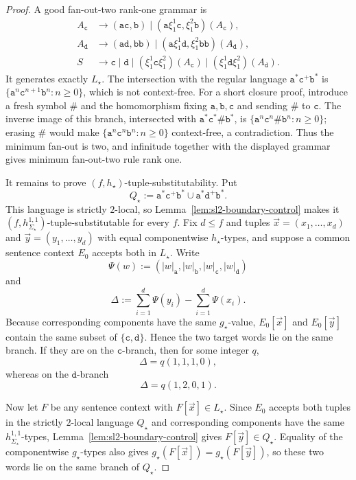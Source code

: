 \documentclass[11pt]{article}
\numberwithin{equation}{section}
\theoremstyle{plain}
\theoremstyle{definition}
\theoremstyle{remark}
\newcommand{\tuple}[1]{\vec{#1}}
\begin{document}
\begin{proof}
A good fan-out-two rank-one grammar is
\[
\begin{aligned}
 A_{\mathtt c}
   &\to(\mathtt a\mathtt c,\mathtt b)
     \mid(\mathtt a\xi_1^1\mathtt c,\xi_1^2\mathtt b)(A_{\mathtt c}),\\
 A_{\mathtt d}
   &\to(\mathtt a\mathtt d,\mathtt b\mathtt b)
     \mid(\mathtt a\xi_1^1\mathtt d,\xi_1^2\mathtt b\mathtt b)(A_{\mathtt d}),\\
 S&\to\mathtt c\mid\mathtt d
   \mid(\xi_1^1\mathtt c\xi_1^2)(A_{\mathtt c})
   \mid(\xi_1^1\mathtt d\xi_1^2)(A_{\mathtt d}).
\end{aligned}
\]
It generates exactly $L_\star$.  The intersection with the regular language
$\mathtt a^*\mathtt c^+\mathtt b^*$ is
$\{\mathtt a^n\mathtt c^{n+1}\mathtt b^n:n\ge0\}$, which is not
context-free.  For a short closure proof, introduce a fresh symbol
$\mathtt\#$ and the homomorphism fixing $\mathtt a,\mathtt b,\mathtt c$ and
sending $\mathtt\#$ to $\mathtt c$.  The inverse image of this branch,
intersected with
$\mathtt a^*\mathtt c^*\mathtt\#\mathtt b^*$, is
$\{\mathtt a^n\mathtt c^n\mathtt\#\mathtt b^n:n\ge0\}$; erasing
$\mathtt\#$ would make $\{\mathtt a^n\mathtt c^n\mathtt b^n:n\ge0\}$
context-free, a contradiction.  Thus the minimum fan-out is two, and
infinitude together with the displayed grammar gives minimum fan-out-two rule
rank one.

It remains to prove $(f,h_\star)$-tuple-substitutability.  Put
\[
 Q_\star
 :=\mathtt a^*\mathtt c^+\mathtt b^*
   \cup\mathtt a^*\mathtt d^+\mathtt b^*.
\]
This language is strictly $2$-local, so
Lemma~\ref{lem:sl2-boundary-control} makes it
$(f,h_{\Sigma_\star}^{1,1})$-tuple-substitutable for every $f$.
Fix $d\le f$ and tuples
$\tuple x=(x_1,\ldots,x_d)$ and
$\tuple y=(y_1,\ldots,y_d)$ with equal componentwise $h_\star$-types, and
suppose a common sentence context $E_0$ accepts both in $L_\star$.
Write
\[
  \Psi(w):=(|w|_{\mathtt a},|w|_{\mathtt b},
             |w|_{\mathtt c},|w|_{\mathtt d})
\]
and
\[
  \Delta:=\sum_{i=1}^d\Psi(y_i)-\sum_{i=1}^d\Psi(x_i).
\]
Because corresponding components have the same $g_\star$-value,
$E_0[\tuple x]$ and $E_0[\tuple y]$ contain the same subset of
$\{\mathtt c,\mathtt d\}$.  Hence the two target words lie on the same branch.
If they are on the $\mathtt c$-branch, then for some integer $q$,
\[
  \Delta=q(1,1,1,0),
\]
whereas on the $\mathtt d$-branch
\[
  \Delta=q(1,2,0,1).
\]

Now let $F$ be any sentence context with $F[\tuple x]\in L_\star$.
Since $E_0$ accepts both tuples in the strictly $2$-local language $Q_\star$
and corresponding components have the same $h_{\Sigma_\star}^{1,1}$-types,
Lemma~\ref{lem:sl2-boundary-control} gives $F[\tuple y]\in Q_\star$.
Equality of the componentwise $g_\star$-types also gives
$g_\star(F[\tuple x])=g_\star(F[\tuple y])$, so these two words lie on the
same branch of $Q_\star$.


\end{proof}
\end{document}
